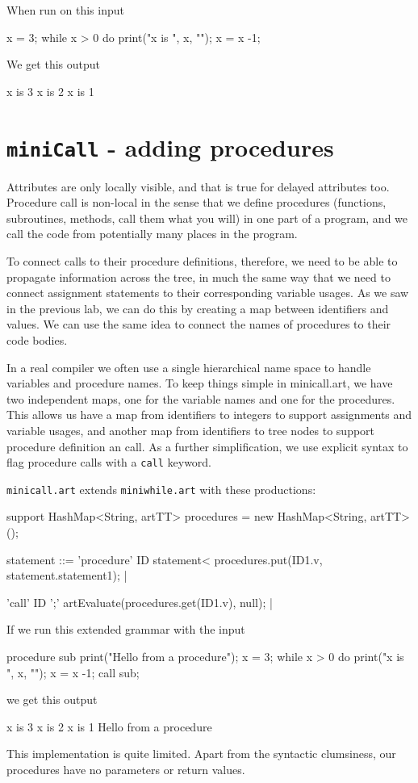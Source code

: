 When run on this input
\begin{codeblock}
{
x = 3;
while x > 0 do { print("x is ", x, "\n"); x = x -1; }
}
\end{codeblock}
We get this output
\begin{codeblock}
x is 3
x is 2
x is 1
\end{codeblock}
\clearpage
\section{{\tt miniCall} - adding procedures}
Attributes are only locally visible, and that is true for delayed attributes too. Procedure call is non-local in the sense that we define procedures (functions, subroutines, methods, call them what you will) in one part of a program, and we call the code from potentially many places in the program.  

To connect calls to their procedure definitions, therefore, we need to be able to propagate information across the tree, in much the same way that we need to connect assignment statements to their corresponding variable usages. As we saw in the previous lab, we can do this by creating a map between identifiers and values. We can use the same idea to connect the names of procedures to their code bodies.

In a real compiler we often use a single hierarchical name space to handle variables and procedure names. To keep things simple in minicall.art, we have two independent maps, one for the variable names and one for the procedures. This allows us have a map from identifiers to integers to support assignments and variable usages, and another map from identifiers to tree nodes to support procedure definition an call. As a further simplification, we use explicit syntax to flag procedure calls with a {\tt call} keyword.

{\tt minicall.art} extends {\tt miniwhile.art} with these productions:
\begin{codeblock}
support {HashMap<String, artTT> procedures = new HashMap<String, artTT>();}

statement ::=  'procedure' ID statement< 
                       { procedures.put(ID1.v, statement.statement1); } |
              
           'call' ID ';' { artEvaluate(procedures.get(ID1.v), null); } |
\end{codeblock}
If we run this extended grammar with the input
\begin{codeblock}
{
procedure sub { print("Hello from a procedure\n"); }
x = 3;
while x > 0 do { print("x is ", x, "\n"); x = x -1; }
call sub;
}
\end{codeblock}
we get this output
\begin{codeblock}
x is 3
x is 2
x is 1
Hello from a procedure
\end{codeblock}
This implementation is quite limited. Apart from the syntactic clumsiness, our procedures have no parameters or return values.

